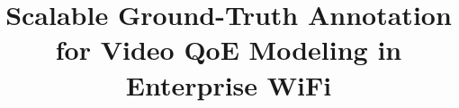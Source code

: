 \documentclass[10pt,conference,letterpaper]{IEEEtran}
\begin{document}
\title{ Scalable Ground-Truth Annotation for Video QoE Modeling in Enterprise WiFi}
\author{
}

\maketitle












\end{document}
